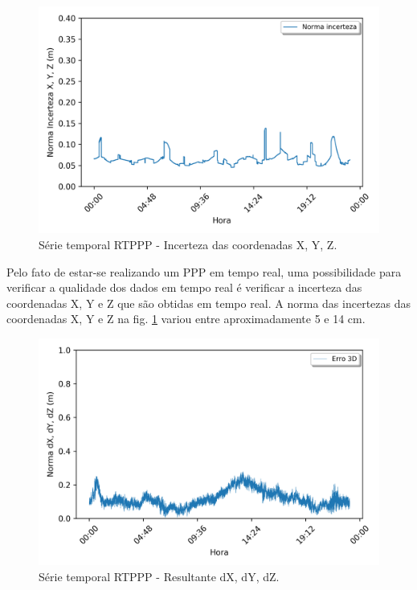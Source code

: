 \begin{figure}[H]
\centering
\includegraphics[scale=0.9]{data/Graphics/POAL20636/POAL20636_graphic_uncertainty.png}
\caption{Série temporal RTPPP - Incerteza das coordenadas X, Y, Z.}
\label{incert1}
\end{figure}

Pelo fato de estar-se realizando um PPP em tempo real, uma possibilidade para verificar a qualidade dos dados em tempo real é verificar a incerteza das coordenadas X, Y e Z que são obtidas em tempo real. A norma das incertezas das coordenadas X, Y e Z na fig. \ref{incert1} variou entre aproximadamente 5 e 14 cm.

\begin{figure}[H]
\centering
\includegraphics[scale=0.9]{data/Graphics/POAL20636/POAL20636_graphic_result.png}
\caption{Série temporal RTPPP - Resultante dX, dY, dZ.}
\label{result1}
\end{figure}

